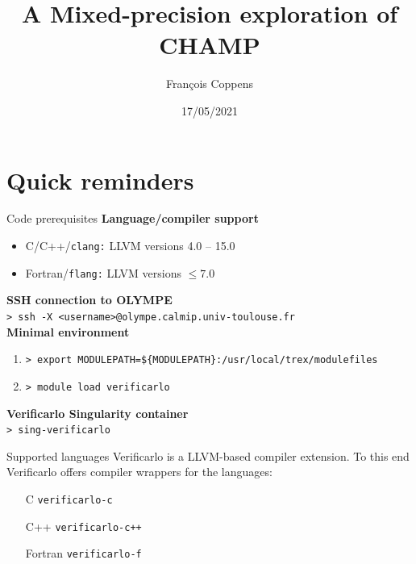 \documentclass[aspectratio=169]{beamer}
\author{François Coppens}
\institute{Université de Versailles Saint-Quentin-en-Yvelines}
\date{17/05/2021}
\title{A Mixed-precision exploration of CHAMP}
\begin{document}
  \maketitle
  
  \section{Quick reminders}
  
    \begin{frame}{Code prerequisites}
      \textbf{Language/compiler support}
      \begin{itemize}
        \item C/C++/\texttt{clang:} LLVM versions 4.0 -- 15.0
        \item Fortran/\texttt{flang:} LLVM versions $\leq7.0$
      \end{itemize}
      \textbf{SSH connection to OLYMPE}\\
      \texttt{> ssh -X <username>@olympe.calmip.univ-toulouse.fr}\\
      \textbf{Minimal environment}
      \begin{enumerate}
        \item \texttt{> export MODULEPATH=\$\{MODULEPATH\}:/usr/local/trex/modulefiles}
        \item \texttt{> module load verificarlo}
      \end{enumerate}
      \textbf{Verificarlo Singularity container}\\
      \texttt{> sing-verificarlo} 
    \end{frame}
    
    \begin{frame}{Supported languages}
      Verificarlo is a LLVM-based compiler extension. To this end Verificarlo offers compiler wrappers for the languages:\\
      
      \begin{itemize}
        \item[C] \texttt{verificarlo-c}
        \item[C++] \texttt{verificarlo-c++}
        \item[Fortran] \texttt{verificarlo-f}
      \end{itemize}
    \end{frame}
      
\end{document}
